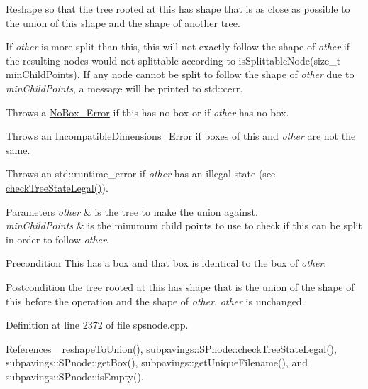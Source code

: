 \-Reshape so that the tree rooted at this has shape that is as close as possible to the union of this shape and the shape of another tree. 

\-If {\itshape other\/} is more split than this, this will not exactly follow the shape of {\itshape other\/} if the resulting nodes would not splittable according to is\-Splittable\-Node(size\-\_\-t min\-Child\-Points). \-If any node cannot be split to follow the shape of {\itshape other\/} due to {\itshape min\-Child\-Points\/}, a message will be printed to std\-::cerr.

\-Throws a \hyperlink{classsubpavings_1_1NoBox__Error}{\-No\-Box\-\_\-\-Error} if this has no box or if {\itshape other\/} has no box.

\-Throws an \hyperlink{classsubpavings_1_1IncompatibleDimensions__Error}{\-Incompatible\-Dimensions\-\_\-\-Error} if boxes of this and {\itshape other\/} are not the same.

\-Throws an std\-::runtime\-\_\-error if {\itshape other\/} has an illegal state (see \hyperlink{classsubpavings_1_1SPSnode_a7cf5893a0c2bcfe03caf2865203e6678}{check\-Tree\-State\-Legal()}).


\begin{DoxyParams}{\-Parameters}
{\em other} & is the tree to make the union against. \\
\hline
{\em min\-Child\-Points} & is the minumum child points to use to check if this can be split in order to follow {\itshape other\/}. \\
\hline
\end{DoxyParams}
\begin{DoxyPrecond}{\-Precondition}
\-This has a box and that box is identical to the box of {\itshape other\/}. 
\end{DoxyPrecond}
\begin{DoxyPostcond}{\-Postcondition}
the tree rooted at this has shape that is the union of the shape of this before the operation and the shape of {\itshape other\/}. {\itshape other\/} is unchanged. 
\end{DoxyPostcond}


\-Definition at line 2372 of file spsnode.\-cpp.



\-References \-\_\-reshape\-To\-Union(), subpavings\-::\-S\-Pnode\-::check\-Tree\-State\-Legal(), subpavings\-::\-S\-Pnode\-::get\-Box(), subpavings\-::get\-Unique\-Filename(), and subpavings\-::\-S\-Pnode\-::is\-Empty().


